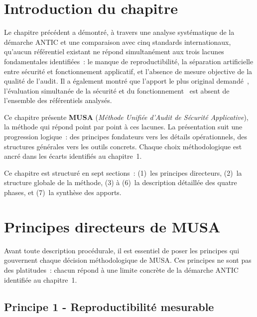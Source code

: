 \documentclass[12pt,a4paper,oneside]{report}
\begin{document}
\section*{Introduction du chapitre}

Le chapitre pr\'ec\'edent a d\'emontr\'e, \`a travers une analyse syst\'ematique
de la d\'emarche ANTIC et une comparaison avec cinq standards internationaux,
qu'aucun r\'ef\'erentiel existant ne r\'epond simultan\'ement aux trois lacunes
fondamentales identifi\'ees~: le manque de reproductibilit\'e, la s\'eparation
artificielle entre s\'ecurit\'e et fonctionnement applicatif, et l'absence de
mesure objective de la qualit\'e de l'audit. Il a \'egalement montr\'e que
l'apport le plus original demand\'e~, l'\'evaluation simultan\'ee de la
s\'ecurit\'e et du fonctionnement~ est absent de l'ensemble des r\'ef\'erentiels
analys\'es.

Ce chapitre pr\'esente \textbf{MUSA} (\textit{M\'ethode Unifi\'ee d'Audit de
S\'ecurit\'e Applicative}), la m\'ethode qui r\'epond point par point \`a ces
lacunes. La pr\'esentation suit une progression logique~: des principes fondateurs
vers les d\'etails op\'erationnels, des structures g\'en\'erales vers les outils
concrets. Chaque choix m\'ethodologique est ancr\'e dans les \'ecarts identifi\'es
au chapitre~1.

Ce chapitre est structur\'e en sept sections~: (1)~les principes directeurs,
(2)~la structure globale de la m\'ethode, (3) \`a (6)~la description d\'etaill\'ee
des quatre phases, et (7)~la synth\`ese des apports.

\section{Principes directeurs de MUSA}
\label{sec:principes}

Avant toute description proc\'edurale, il est essentiel de poser les principes
qui gouvernent chaque d\'ecision m\'ethodologique de MUSA. Ces principes ne sont
pas des platitudes~: chacun r\'epond \`a une limite concr\`ete de la d\'emarche
ANTIC identifi\'ee au chapitre~1.

\subsection{Principe 1 - Reproductibilit\'e mesurable}
\end{document}
